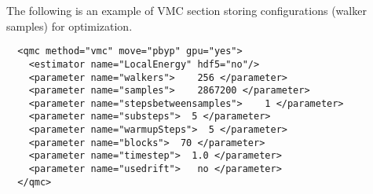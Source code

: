 The following is an example of VMC section storing configurations (walker samples) for optimization.
\begin{lstlisting}
  <qmc method="vmc" move="pbyp" gpu="yes">
    <estimator name="LocalEnergy" hdf5="no"/>
    <parameter name="walkers">    256 </parameter>
    <parameter name="samples">    2867200 </parameter>
    <parameter name="stepsbetweensamples">    1 </parameter>
    <parameter name="substeps">  5 </parameter>
    <parameter name="warmupSteps">  5 </parameter>
    <parameter name="blocks">  70 </parameter>
    <parameter name="timestep">  1.0 </parameter>
    <parameter name="usedrift">   no </parameter>
  </qmc>
\end{lstlisting}



